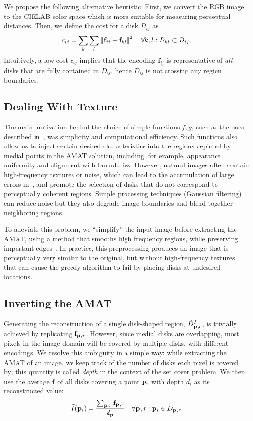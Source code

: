 \documentclass[10pt,twocolumn,letterpaper]{article}
\begin{document}
We propose the following alternative heuristic:
First, we convert the RGB image to the CIELAB color space which is more suitable for measuring perceptual distances.
Then, we define the cost for a disk $D_{ij}$ as
\begin{equation}
c_{ij} = \sum_k \sum_l \left \lVert \mathbf{f}_{ij} - \mathbf{f}_{kl}  \right \rVert^2 \quad \forall k,l: D_{kl} \subset D_{ij}.
\label{eq:diskcost}
\end{equation}
Intuitively, a low cost $c_{ij}$ implies that the encoding $\mathbf{f}_{ij}$ is representative of \emph{all}
disks that are fully contained in $D_{ij}$, hence $D_{ij}$ is not crossing any region boundaries.

\subsection{Dealing With Texture}\label{sec:implementation:texture}
The main motivation behind the choice of simple functions $f,g$,
such as the ones described in~, was simplicity and  computational efficiency.
Such functions also allow us to inject certain desired characteristics into the regions depicted by medial points in the AMAT solution, 
including, for example, appearance uniformity and alignment with boundaries.
However, natural images often contain high-frequency textures or noise, which can lead to the accumulation of large errors 
in~, and promote the selection of disks that do not correspond to perceptually coherent regions. 
Simple processing techniques (\eg Gaussian filtering) can reduce noise but they also degrade image boundaries and
blend together neighboring regions.

To alleviate this problem, we ``simplify'' the input image before extracting the AMAT, using a method that smooths high frequency
regions, while preserving important edges~\cite{xu2011image}.
In practice, this preprocessing produces an image that is  perceptually very similar to the original, 
but without high-frequency textures that can cause the greedy algorithm to fail by placing disks at undesired locations.

\subsection{Inverting the AMAT}\label{sec:implementation:inverting}
Generating the reconstruction of a single disk-shaped region, $\tilde{D}_{\mathbf{p}_{},r}^I$, is trivially achieved by
replicating $\mathbf{f}_{\mathbf{p}_{},r}$.
However, since medial disks are overlapping, most pixels in the image domain will be covered by multiple disks,
with different encodings.
We resolve this ambiguity in a simple way: while extracting the AMAT of an image, we keep track of the
number of disks each pixel is covered by; this quantity is called \emph{depth} in the context of the set cover problem.
We then use the average $\mathbf{f}_{}$ of all disks covering a point $\mathbf{p}_{i}$ with depth $d_i$ as its reconstructed value:
\begin{equation}
\tilde{I}(\mathbf{p}_{i}) = \frac{\sum_{\mathbf{p}_{},r} \mathbf{f}_{\mathbf{p}_{},r}}{d_{\mathbf{p}_{}}} \quad \forall \mathbf{p}_{},r: \mathbf{p}_{i}\in D_{\mathbf{p}_{},r}
\label{eq:reconstruction}
\end{equation}
\end{document}

